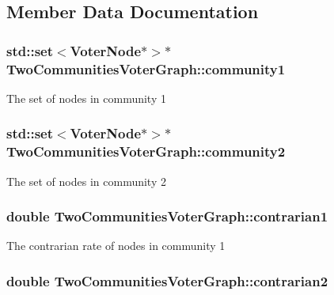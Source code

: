 \subsection{Member Data Documentation}
\hypertarget{classTwoCommunitiesVoterGraph_a354768f44c0a3daa6d0a70a20df77af5}{
\subsubsection[{community1}]{\setlength{\rightskip}{0pt plus 5cm}std\-::set$<${\bf Voter\-Node}$\ast$$>$$\ast$ Two\-Communities\-Voter\-Graph\-::community1}}\label{classTwoCommunitiesVoterGraph_a354768f44c0a3daa6d0a70a20df77af5}
The set of nodes in community 1 \hypertarget{classTwoCommunitiesVoterGraph_a7c918c6733474caa86bc2d217bd2cb4d}{
\subsubsection[{community2}]{\setlength{\rightskip}{0pt plus 5cm}std\-::set$<${\bf Voter\-Node}$\ast$$>$$\ast$ Two\-Communities\-Voter\-Graph\-::community2}}\label{classTwoCommunitiesVoterGraph_a7c918c6733474caa86bc2d217bd2cb4d}
The set of nodes in community 2 \hypertarget{classTwoCommunitiesVoterGraph_a883bf57bf07fb2e59f05df65df859a46}{
\subsubsection[{contrarian1}]{\setlength{\rightskip}{0pt plus 5cm}double Two\-Communities\-Voter\-Graph\-::contrarian1}}\label{classTwoCommunitiesVoterGraph_a883bf57bf07fb2e59f05df65df859a46}
The contrarian rate of nodes in community 1 \hypertarget{classTwoCommunitiesVoterGraph_a4274a05f5e2ceae57de1f0e71493b9a4}{
\subsubsection[{contrarian2}]{\setlength{\rightskip}{0pt plus 5cm}double Two\-Communities\-Voter\-Graph\-::contrarian2}}\label{classTwoCommunitiesVoterGraph_a4274a05f5e2ceae57de1f0e71493b9a4}
